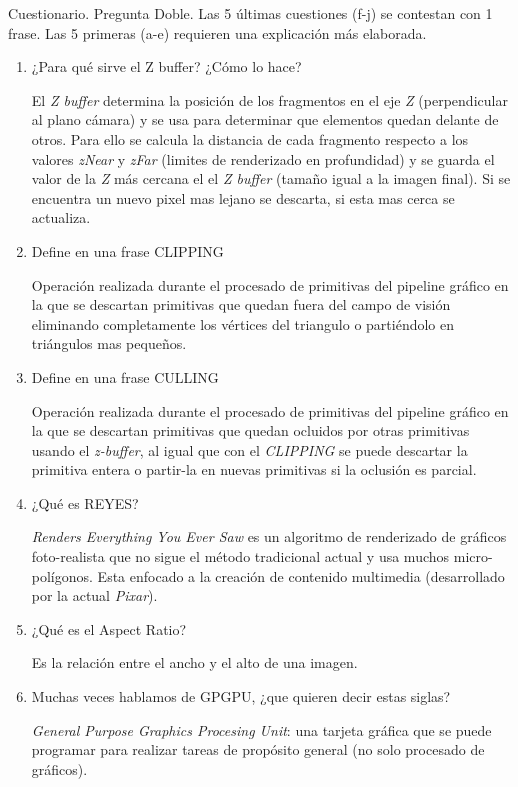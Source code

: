 \begin{pregunta}{Cuestionario. Pregunta Doble. Las 5 últimas cuestiones (f-j) se contestan con 1 frase. Las 5
primeras (a-e) requieren una explicación más elaborada.}
\begin{enumerate}[label=(\alph*)]
    \item ¿Para qué sirve el Z buffer? ¿Cómo lo hace?

        El \emph{Z buffer} determina la posición de los fragmentos en el eje
        \emph{Z} (perpendicular al plano cámara) y se usa para determinar que
        elementos quedan delante de otros. Para ello se calcula la distancia de
        cada fragmento respecto a los valores \emph{zNear} y \emph{zFar}
        (limites de renderizado en profundidad) y se guarda el valor de la
        \emph{Z} más cercana el el \emph{Z buffer} (tamaño igual a la imagen
        final). Si se encuentra un nuevo pixel mas lejano se descarta, si esta
        mas cerca se actualiza.

        \pagebreak
    \item Define en una frase CLIPPING

        Operación realizada durante el procesado de primitivas del pipeline
        gráfico en la que se descartan primitivas que quedan fuera del campo de
        visión eliminando completamente los vértices del triangulo o partiéndolo
        en triángulos mas pequeños.

    \item Define en una frase CULLING

        Operación realizada durante el procesado de primitivas del pipeline
        gráfico en la que se descartan primitivas que quedan ocluidos por otras
        primitivas usando el \emph{z-buffer}, al igual que con el \emph{CLIPPING}
        se puede descartar la primitiva entera o partir-la en nuevas primitivas
        si la oclusión es parcial.

    \item ¿Qué es REYES?

        \emph{Renders Everything You Ever Saw} es un algoritmo de renderizado de
        gráficos foto-realista que no sigue el método tradicional actual y usa
        muchos micro-polígonos. Esta enfocado a la creación de contenido
        multimedia (desarrollado por la actual \emph{Pixar}).
        \cite{shua_rispec_2011}

    \item ¿Qué es el Aspect Ratio?

        Es la relación entre el ancho y el alto de una imagen.

    \item Muchas veces hablamos de GPGPU, ¿que quieren decir estas siglas?

        \emph{General Purpose Graphics Procesing Unit}: una tarjeta gráfica que
        se puede programar para realizar tareas de propósito general (no solo
        procesado de gráficos).

\end{enumerate}

\end{pregunta}
